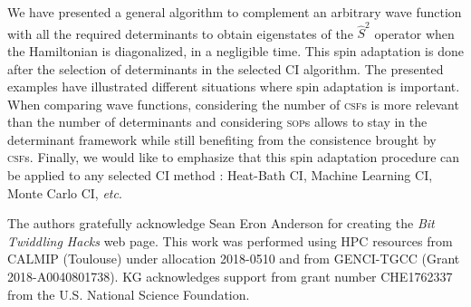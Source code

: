 \documentclass[aip,jcp,reprint,showkeys]{revtex4-1}
\newcommand{\stwo}{\hat{S}^2}
\newcommand{\sop}{\textsc{sop}}
\newcommand{\csf}{\textsc{csf}}
\begin{document}
We have presented a general algorithm to complement an arbitrary wave function
with all the required determinants to obtain eigenstates of the $\stwo$
operator when the Hamiltonian is diagonalized, in a negligible time.
This spin adaptation is done after the selection of determinants in the
selected CI algorithm.
The presented examples have illustrated different situations where
spin adaptation is important.  When comparing wave functions, considering the
number of \csf s is more relevant than the number of determinants and
considering \sop s allows to stay in the determinant framework while still
benefiting from the consistence brought by \csf s.
Finally, we would like to emphasize that this spin adaptation procedure can be
applied to any selected CI method : Heat-Bath CI, Machine Learning CI, Monte
Carlo CI, \textit{etc}.


\begin{acknowledgments}
The authors gratefully acknowledge Sean Eron Anderson for creating the 
\emph{Bit Twiddling Hacks} web page.
This work was performed using HPC resources from CALMIP (Toulouse) under
allocation 2018-0510 and from GENCI-TGCC (Grant 2018-A0040801738).
KG acknowledges support from grant number CHE1762337 from the U.S. National Science Foundation.
\end{acknowledgments}



\end{document}
